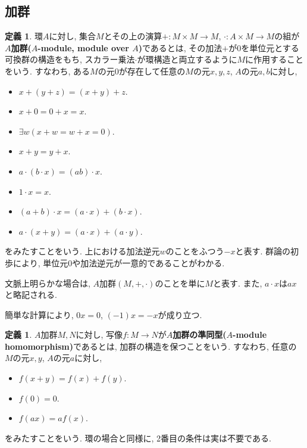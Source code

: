 \documentclass[a4paper, twoside]{bxjsarticle}
\newcommand{\tb}{\textbf}
\theoremstyle{definition}
\newtheorem{defn}[thm]{定義}
\begin{document}
        \subsection{加群}
        \begin{defn}
            \label{module}
            環$A$に対し, 集合$M$とその上の演算$+\colon M\times M\to M$, $\cdot\colon A\times M\to M$の組が\tb{$A$加群($A$-module, module over $A$)}であるとは, その加法$+$が$0$を単位元とする可換群の構造をもち, スカラー乗法$\cdot$が環構造と両立するように$M$に作用することをいう. すなわち, ある$M$の元$0$が存在して任意の$M$の元$x, y, z$, $A$の元$a, b$に対し,
            \begin{itemize}
                \item $x+(y+z)=(x+y)+z$.
                \item $x+0=0+x=x$.
                \item $\exists w(x+w=w+x=0)$.
                \item $x+y=y+x$.
                \item $a\cdot(b\cdot x)=(ab)\cdot x$.
                \item $1\cdot x=x$.
                \item $(a+b)\cdot x=(a\cdot x)+(b\cdot x)$.
                \item $a\cdot(x+y)=(a\cdot x)+(a\cdot y)$. 
            \end{itemize}
            をみたすことをいう. 上における加法逆元$w$のことをふつう$-x$と表す. 群論の初歩により, 単位元$0$や加法逆元が一意的であることがわかる.
            
            文脈上明らかな場合は, $A$加群$(M, +, \cdot)$のことを単に$M$と表す. また, $a\cdot x$は$ax$と略記される.

            簡単な計算により, $0x = 0$, $(-1)x=-x$が成り立つ.
        \end{defn}
        \begin{defn}
            \label{modulehom}
            $A$加群$M, N$に対し, 写像$f\colon M\to N$が\tb{$A$加群の準同型($A$-module homomorphism)}であるとは, 加群の構造を保つことをいう. すなわち, 任意の$M$の元$x, y$, $A$の元$a$に対し,
            \begin{itemize}
                \item $f(x+y)=f(x)+f(y)$.
                \item $f(0)=0$.
                \item $f(ax)=af(x)$.
            \end{itemize}
            をみたすことをいう. 環の場合と同様に, 2番目の条件は実は不要である.
        \end{defn}
\end{document}
